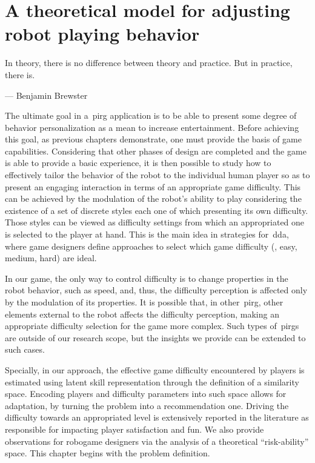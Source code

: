 \chapter{A theoretical model for adjusting robot playing behavior}\label{ch:adaptation}
\epigraph{In theory, there is no difference between theory and practice. But in practice, there is. 
}{--- Benjamin Brewster}

The ultimate goal in a~\gls{pirg} application is to be able to present some degree of behavior personalization as a mean to increase entertainment. Before achieving this goal, as previous chapters demonstrate, one must provide the basis of game capabilities. Considering that other phases of design are completed and the game is able to provide a basic experience, it is then possible to study how to effectively tailor the behavior of the robot to the individual human player so as to present an engaging interaction in terms of an appropriate game difficulty. This can be achieved by the modulation of the robot's ability to play considering the existence of a set of discrete styles each one of which presenting its own difficulty. Those styles can be viewed as difficulty settings from which an appropriated one is selected to the player at hand. This is the main idea in strategies for~\glsdesc{dda}, where game designers define approaches to select which game difficulty (\eg, easy, medium, hard) are ideal. 

In our game, the only way to control difficulty is to change properties in the robot behavior, such as speed, and, thus, the difficulty perception is affected only by the modulation of its properties. It is possible that, in other~\gls{pirg}, other elements external to the robot affects the difficulty perception, making an appropriate difficulty selection for the game more complex. Such types of~\gls{pirg}s are outside of our research scope, but the insights we provide can be extended to such cases. 

Specially, in our approach, the effective game difficulty encountered by players is estimated using latent skill representation through the definition of a similarity space. Encoding players and difficulty parameters into such space allows for adaptation, by turning the problem into a recommendation one. Driving the difficulty towards an appropriated level is extensively reported in the literature as responsible for impacting player satisfaction and fun. We also provide observations for robogame designers via the analysis of a theoretical ``risk-ability'' space. This chapter begins with the problem definition.

